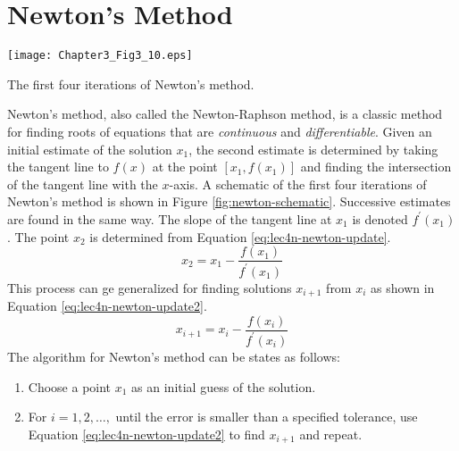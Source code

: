 \section{Newton's Method}

\begin{marginfigure}
\texttt{[image: Chapter3\_Fig3\_10.eps]}
\caption{The first four iterations of Newton's method.}
\label{fig:newton-schematic}
\end{marginfigure}
Newton's method, also called the Newton-Raphson method, is a classic method for finding roots of equations that are \emph{continuous} and \emph{differentiable}. Given an initial estimate of the solution $x_1$, the second estimate is determined by taking the tangent line to $f(x)$ at the point $[x_1,f(x_1)]$ and finding the intersection of the tangent line with the $x$-axis. A schematic of the first four iterations of Newton's method is shown in Figure \ref{fig:newton-schematic}.  Successive estimates are found in the same way.  The slope of the tangent line at $x_1$ is denoted $f^{\prime}(x_1)$.  The point $x_2$ is determined from Equation \ref{eq:lec4n-newton-update}.
\begin{equation}
x_2 = x_1 - \frac{f(x_1)}{f^{\prime}(x_1)}
\label{eq:lec4n-newton-update}
\end{equation}
This process can ge generalized for finding solutions $x_{i+1}$ from $x_i$ as shown in Equation \ref{eq:lec4n-newton-update2}.
\begin{equation}
x_{i+1} = x_{i} - \frac{f(x_i)}{f^{\prime}(x_i)}
\label{eq:lec4n-newton-update2}
\end{equation}
The algorithm for Newton's method can be states as follows:
\begin{enumerate}
\item Choose a point $x_1$ as an initial guess of the solution.
\item For $i = 1,2,\dots,$ until the error is smaller than a specified tolerance, use Equation \ref{eq:lec4n-newton-update2} to find $x_{i+1}$ and repeat.
\end{enumerate}


